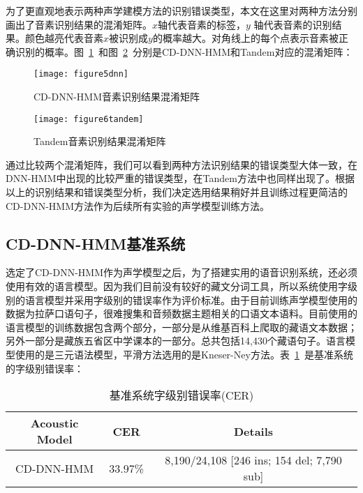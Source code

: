 为了更直观地表示两种声学建模方法的识别错误类型，本文在这里对两种方法分别画出了音素识别结果的混淆矩阵。$x$轴代表音素的标签，$y$ 轴代表音素的识别结果。颜色越亮代表音素$x$被识别成$y$的概率越大。对角线上的每个点表示音素被正确识别的概率。图~\ref{fig:figure5}~和图~\ref{fig:figure6}~分别是CD-DNN-HMM和Tandem对应的混淆矩阵：
\begin{figure}[htbp]
\centering
\texttt{[image: figure5dnn]}
\caption{CD-DNN-HMM音素识别结果混淆矩阵}\label{fig:figure5}
\vspace{\baselineskip}
\end{figure}

\begin{figure}[htbp]
\centering
\texttt{[image: figure6tandem]}
\caption{Tandem音素识别结果混淆矩阵}\label{fig:figure6}
\vspace{\baselineskip}
\end{figure}

通过比较两个混淆矩阵，我们可以看到两种方法识别结果的错误类型大体一致，在DNN-HMM中出现的比较严重的错误类型，在Tandem方法中也同样出现了。根据以上的识别结果和错误类型分析，我们决定选用结果稍好并且训练过程更简洁的CD-DNN-HMM方法作为后续所有实验的声学模型训练方法。
\subsection{CD-DNN-HMM基准系统}
选定了CD-DNN-HMM作为声学模型之后，为了搭建实用的语音识别系统，还必须使用有效的语言模型。因为我们目前没有较好的藏文分词工具，所以系统使用字级别的语言模型并采用字级别的错误率作为评价标准。由于目前训练声学模型使用的数据为拉萨口语句子，很难搜集和音频数据主题相关的口语文本语料。目前使用的语言模型的训练数据包含两个部分，一部分是从维基百科上爬取的藏语文本数据；另外一部分是藏族五省区中学课本的一部分。总共包括14,430个藏语句子。语言模型使用的是三元语法模型，平滑方法选用的是Kneser-Ney方法\cite{kneser1995improved}。表~\ref{tab:table3}~是基准系统的字级别错误率：
\begin{table}[htbp]
\caption{基准系统字级别错误率(CER)}\label{tab:table3}
\vspace{0.5em}\centering\wuhao
\begin{tabular}{ccc}
\toprule[1.5pt]
Acoustic Model & CER & Details \\
\midrule[1pt]
 CD-DNN-HMM & 33.97\% & 8,190/24,108 [246 ins; 154 del; 7,790 sub] \\
\bottomrule[1.5pt]
\end{tabular}
\vspace{\baselineskip}
\end{table}

